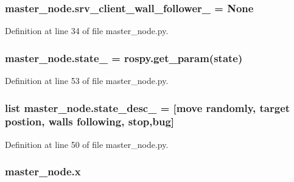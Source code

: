 \subsubsection[{\texorpdfstring{srv\+\_\+client\+\_\+wall\+\_\+follower\+\_\+}{srv_client_wall_follower_}}]{\setlength{\rightskip}{0pt plus 5cm}master\+\_\+node.\+srv\+\_\+client\+\_\+wall\+\_\+follower\+\_\+ = None}\hypertarget{namespacemaster__node_afde90e85906bb75fd698d31876e4060a}{}\label{namespacemaster__node_afde90e85906bb75fd698d31876e4060a}


Definition at line 34 of file master\+\_\+node.\+py.

\subsubsection[{\texorpdfstring{state\+\_\+}{state_}}]{\setlength{\rightskip}{0pt plus 5cm}master\+\_\+node.\+state\+\_\+ = rospy.\+get\+\_\+param(\textquotesingle{}state\textquotesingle{})}\hypertarget{namespacemaster__node_aceeacc0099424e36d80c5c244ed91886}{}\label{namespacemaster__node_aceeacc0099424e36d80c5c244ed91886}


Definition at line 53 of file master\+\_\+node.\+py.

\subsubsection[{\texorpdfstring{state\+\_\+desc\+\_\+}{state_desc_}}]{\setlength{\rightskip}{0pt plus 5cm}list master\+\_\+node.\+state\+\_\+desc\+\_\+ = \mbox{[}\textquotesingle{}move randomly\textquotesingle{}, \textquotesingle{}target postion\textquotesingle{}, \textquotesingle{}walls following\textquotesingle{}, \textquotesingle{}stop\textquotesingle{},\textquotesingle{}bug\textquotesingle{}\mbox{]}}\hypertarget{namespacemaster__node_a8aa254dac660c2d7728f527c2226ed1b}{}\label{namespacemaster__node_a8aa254dac660c2d7728f527c2226ed1b}


Definition at line 50 of file master\+\_\+node.\+py.

\subsubsection[{\texorpdfstring{x}{x}}]{\setlength{\rightskip}{0pt plus 5cm}master\+\_\+node.\+x}\hypertarget{namespacemaster__node_a9ea1782ac4a7c8c92e8555fa503ac755}{}\label{namespacemaster__node_a9ea1782ac4a7c8c92e8555fa503ac755}


